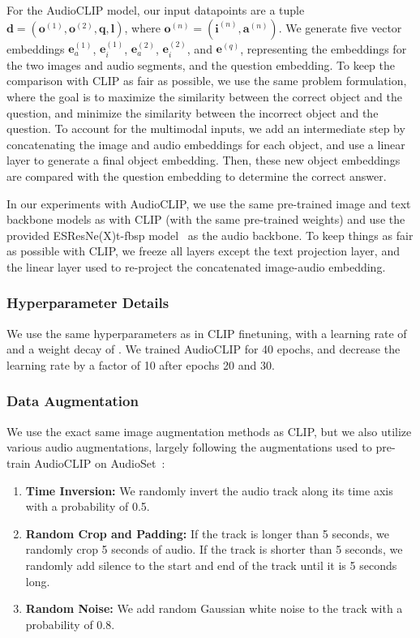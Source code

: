 \documentclass[runningheads]{llncs}
\begin{document}
For the AudioCLIP model, our input datapoints are a tuple $\boldsymbol{d} = (\boldsymbol{o}^{(1)}, \boldsymbol{o}^{(2)}, \boldsymbol{q}, \boldsymbol{l})$, where $\boldsymbol{o}^{(n)} = (\boldsymbol{i}^{(n)}, \boldsymbol{a}^{(n)})$. We generate five vector embeddings $\boldsymbol{e}_a^{(1)}$, $\boldsymbol{e}_i^{(1)}$, $\boldsymbol{e}_a^{(2)}$, $\boldsymbol{e}_i^{(2)}$, and $\boldsymbol{e}^{(q)}$, representing the embeddings for the two images and audio segments, and the question embedding. To keep the comparison with CLIP as fair as possible, we use the same problem formulation, where the goal is to maximize the similarity between the correct object and the question, and minimize the similarity between the incorrect object and the question. To account for the multimodal inputs, we add an intermediate step by concatenating the image and audio embeddings for each object, and use a linear layer to generate a final object embedding. Then, these new object embeddings are compared with the question embedding to determine the correct answer. 

In our experiments with AudioCLIP, we use the same pre-trained image and text backbone models as with CLIP (with the same pre-trained weights) and use the provided ESResNe(X)t-fbsp model~\cite{guzhov2021esresnextfbsp} as the audio backbone. To keep things as fair as possible with CLIP, we freeze all layers except the text projection layer, and the linear layer used to re-project the concatenated image-audio embedding.  

\subsubsection{Hyperparameter Details} We use the same hyperparameters as in CLIP finetuning, with a learning rate of  and a weight decay of . We trained AudioCLIP for 40 epochs, and decrease the learning rate by a factor of 10 after epochs 20 and 30. 

\subsubsection{Data Augmentation} We use the exact same image augmentation methods as CLIP, but we also utilize various audio augmentations, largely following the augmentations used to pre-train AudioCLIP on AudioSet~\cite{guzhov2021audioclip}:

\begin{enumerate}
    \item \textbf{Time Inversion:} We randomly invert the audio track along its time axis with a probability of 0.5.
    \item \textbf{Random Crop and Padding:} If the track is longer than 5 seconds, we randomly crop 5 seconds of audio. If the track is shorter than 5 seconds, we randomly add silence to the start and end of the track until it is 5 seconds long.
    \item \textbf{Random Noise:} We add random Gaussian white noise to the track with a probability of 0.8. 
\end{enumerate}
\end{document}
